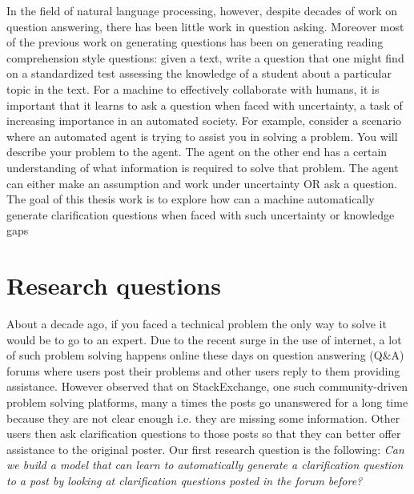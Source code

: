 \documentclass[11pt]{report}
\numberwithin{equation}{section}
\begin{document}
\noindent
In the field of natural language processing, however, despite decades of work on question answering, there has been little work in question asking. Moreover most of the previous work on generating questions has been on generating reading comprehension style questions: given a text, write a question that one might find on a standardized test assessing the knowledge of a student about a particular topic in the text. For a machine to effectively collaborate with humans, it is important that it learns to ask a question when faced with uncertainty, a task of increasing importance in an automated society. For example, consider a scenario where an automated agent is trying to assist you in solving a problem. You will describe your problem to the agent. The agent on the other end has a certain understanding of what information is required to solve that problem. The agent can either make an assumption and work under uncertainty OR ask a question. The goal of this thesis work is to explore how can a machine automatically generate clarification questions when faced with such uncertainty or knowledge gaps

\section{Research questions}

About a decade ago, if you faced a technical problem the only way to solve it would be to go to an expert. Due to the recent surge in the use of internet, a lot of such problem solving happens online these days on question answering (Q\&A) forums where users post their problems and other users reply to them providing assistance. However \cite{asaduzzaman2013answering} observed that on StackExchange, one such community-driven problem solving platforms, many a times the posts go unanswered for a long time because they are not clear enough i.e. they are missing some information. Other users then ask clarification questions to those posts so that they can better offer assistance to the original poster. Our first research question is the following: \textit{Can we build a model that can learn to automatically generate a clarification question to a post by looking at clarification questions posted in the forum before?}\\
\end{document}

